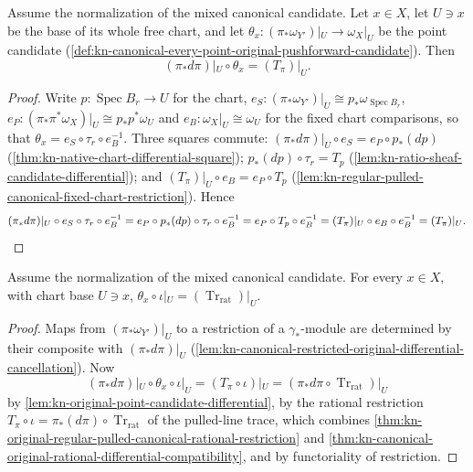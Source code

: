 \begin{lemma}
\label{lem:kn-original-point-candidate-differential}
\leanok
Assume the normalization of the mixed canonical candidate. Let $x\in X$, let
$U\ni x$ be the base of its whole free chart, and let
$\theta_x:(\pi_*\omega_{Y'})|_U\to\omega_X|_U$ be the point candidate
(\cref{def:kn-canonical-every-point-original-pushforward-candidate}). Then
\[
 (\pi_*d\pi)|_U\circ\theta_x=(T_\pi)|_U .
\]
\end{lemma}
\begin{proof}
Write $p:\operatorname{Spec}B_r\to U$ for the chart, $e_S:(\pi_*\omega_{Y'})|_U\cong p_*\omega_{\operatorname{Spec}B_r}$,
$e_P:(\pi_*\pi^*\omega_X)|_U\cong p_*p^*\omega_U$ and $e_B:\omega_X|_U\cong\omega_U$
for the fixed chart comparisons, so that $\theta_x=e_S\circ\tau_r\circ e_B^{-1}$.
Three squares commute: $(\pi_*d\pi)|_U\circ e_S=e_P\circ p_*(dp)$
(\cref{thm:kn-native-chart-differential-square});
$p_*(dp)\circ\tau_r=T_p$ (\cref{lem:kn-ratio-sheaf-candidate-differential});
and $(T_\pi)|_U\circ e_B=e_P\circ T_p$
(\cref{lem:kn-regular-pulled-canonical-fixed-chart-restriction}). Hence
\[
 (\pi_*d\pi)|_U\circ e_S\circ\tau_r\circ e_B^{-1}
 =e_P\circ p_*(dp)\circ\tau_r\circ e_B^{-1}
 =e_P\circ T_p\circ e_B^{-1}
 =(T_\pi)|_U\circ e_B\circ e_B^{-1}=(T_\pi)|_U .\qedhere
\]
\end{proof}

\begin{lemma}
\label{lem:kn-original-point-candidate-regular-factor}
\leanok
Assume the normalization of the mixed canonical candidate. For every $x\in X$,
with chart base $U\ni x$, $\theta_x\circ\iota|_U=(\operatorname{Tr}_{\mathrm{rat}})|_U$.
\end{lemma}
\begin{proof}
Maps from $(\pi_*\omega_{Y'})|_U$ to a restriction of a $\gamma_*$-module are
determined by their composite with $(\pi_*d\pi)|_U$
(\cref{lem:kn-canonical-restricted-original-differential-cancellation}). Now
\[
 (\pi_*d\pi)|_U\circ\theta_x\circ\iota|_U=(T_\pi\circ\iota)|_U
 =(\pi_*d\pi\circ\operatorname{Tr}_{\mathrm{rat}})|_U
\]
by \cref{lem:kn-original-point-candidate-differential}, by the rational
restriction $T_\pi\circ\iota=\pi_*(d\pi)\circ\operatorname{Tr}_{\mathrm{rat}}$
of the pulled-line trace, which combines
\cref{thm:kn-original-regular-pulled-canonical-rational-restriction} and
\cref{thm:kn-canonical-original-rational-differential-compatibility}, and by
functoriality of restriction.
\end{proof}

